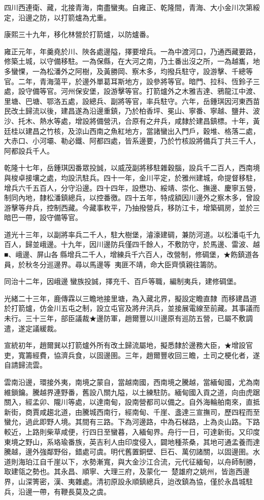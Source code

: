 \begin{pinyinscope}
四川西連衛、藏，北接青海，南盡蠻夷。自雍正、乾隆間，青海、大小金川次第綏定，沿邊之防，以打箭爐為尤重。

康熙三十九年，移化林營於打箭爐，以防爐番。

雍正元年，年羹堯於川、陜各處邊隘，擇要增兵。一為中渡河口，乃通西藏要路，修築土城，以守備移駐。一為保縣，在大河之南，乃土番出沒之所，一為越巂，地多蠻惈，一為松潘外之阿樹，及黃勝岡、察木多，均撥兵駐守，設游擊、千總等官。二年，青海蕩平，於邊外單葛耳斯地方，設參將等官。暗門、拉科、恆鈴子三處，設守備等官。河州保安堡，設游擊等官。打箭爐外之木雅吉達、鴉龍江中渡、里塘、巴塘、鄂洛五處，設總兵、副將等官，率兵駐守。六年，岳鍾琪因河東西苗民改土歸流以後，建昌遂為沿邊重鎮，乃於柏香坪、冕山、寧番、寧越、鹽井、波沙、托木、熱水等處，增設將備營汛，合原有之弁兵，咸隸於建昌鎮標。十年，黃廷桂以建昌之竹核，及涼山西南之魚紅地方，當諸蠻出入門戶，穀堆、格落二處，大赤口、小河壩、勒必鐵、阿都四處，皆系邊要，乃於竹核設將備兵丁共三千人，阿都設兵千人。

乾隆十七年，岳鍾琪因番眾投誠，以威茂副將移駐雜穀腦，設兵千二百人，西南境與梭卓接壤之處，均設汛駐兵。四十一年，金川平定，於雅州建城，命提督移駐，增兵六千五百人，分守沿邊。四十四年，設懋功、綏靖、崇化、撫邊、慶寧五營，制同內地，隸松潘鎮總兵，以控番徼。四十五年，特成額因川邊外之察木多，曾設游擊等弁兵，控制西藏。今藏事敉平，乃抽撥營兵，移防江卡，增築碉房，並於三暗巴一帶，設守備等官。

道光十三年，以副將率兵二千人，駐大樹堡，濬濠建碉，兼防河道。以松潘屯千九百人，歸並峨邊。十九年，因川邊防兵僅四千餘人，不敷防守，於馬邊、雷波、越■、峨邊、屏山各縣增兵二千人，增練兵千六百人，改營制，修碉堡，★飭鎮道各員，於秋冬分巡邊界。尋以馬邊等，夷匪不靖，命大臣齊慎親往籌防。

同治十二年，因峨邊蠻族投誠，擇充千、百戶等職，編制夷兵，建修碉堡。

光緒二十三年，鹿傳霖以三瞻地接里塘，為入藏北界，擬設定瞻直隸，而移建昌道於打箭爐，仿金川五屯之制，設立屯官及將弁汛兵，並接展電線至前藏。其事議而未行。三十三年，部臣議裁★邊防軍，趙爾豐以川邊原有巡防五營，已屬不敷調遣，遂定議緩裁。

宣統初年，趙爾巽以打箭爐外所有改土歸流屬地，擬悉隸於邊務大臣，★增設官吏，寬籌經費，協濟兵食，以固邊圉。三年，趙爾豐收回三瞻，土司之梗化者，遂自請歸流雲。

雲南沿邊，環接外夷，南境之蒙自，當越南國，西南境之騰越，當緬甸國，尤為南維鎖鑰。騰越界連野番，舊設八關九隘，以土練駐防。緬甸國入貢之道，向由虎踞關入，經孟卯、隴川等處，以達南甸，設南營都司以備之。自外海輪舶南來，直抵新街，商賈咸趨北道，由騰城西南行，經南甸、千崖、盞達三宣撫司，歷四程而至蠻允，過此即野人境。其間有三路。下為河邊路，中為石梯路，上為炎山路。下路較近，上路則柴草咸便，行四日至蠻暮，入緬甸界。舟行一日，可達新街。又印度東境之野山，系珞瑜番族，英吉利人由印度侵入，闢地種茶桑，其地可通孟養而達騰越，邊外強鄰野俗，錯處可虞。明代舊置銅壁、巨石、萬仞諸關，以固邊圉。水道則海珀江自千崖以下，水勢漸寬，與大金沙江合流，元代征緬甸，以舟師制勝，取建瓴之勢也。其永昌、順寧、大理三府，及蒙化一，楚雄府之姚州，皆迤西邊界，山深箐密，漢、夷雜處。清初原設永順鎮總兵，迨改鎮為協，僅於永昌城駐兵，沿邊一帶，有鞭長莫及之虞。


\end{pinyinscope}
